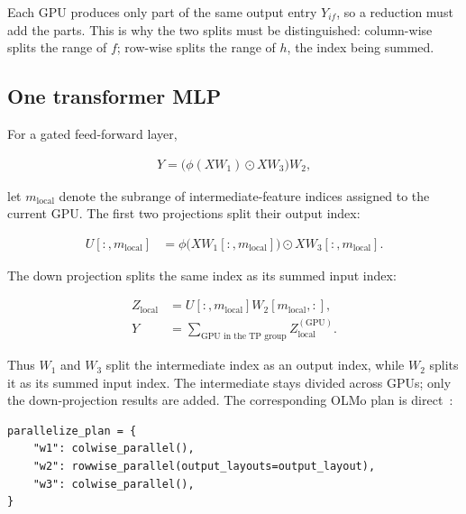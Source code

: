\documentclass[11pt]{article}
\begin{document}
Each GPU produces only part of the same output entry \(Y_{if}\), so a
reduction must add the parts.  This is why the two splits must be
distinguished: column-wise splits the range of \(f\); row-wise splits the
range of \(h\), the index being summed.

\subsection{One transformer MLP}

For a gated feed-forward layer,

\begin{equation}
\begin{split}
Y=\bigl(\phi(XW_1)\odot XW_3\bigr)W_2,
\end{split}
\end{equation}

let \(m_{\mathrm{local}}\) denote the subrange of intermediate-feature indices
assigned to the current GPU.  The first two projections split their output
index:

\begin{equation}
\begin{split}
U[:,m_{\mathrm{local}}]
&=\phi\bigl(XW_1[:,m_{\mathrm{local}}]\bigr)
 \odot XW_3[:,m_{\mathrm{local}}].
\end{split}
\end{equation}

The down projection splits the same index as its summed input index:

\begin{equation}
\begin{split}
Z_{\mathrm{local}}
&=U[:,m_{\mathrm{local}}]W_2[m_{\mathrm{local}},:],\\
Y&=\sum_{\text{GPU in the TP group}}Z_{\mathrm{local}}^{(\text{GPU})}.
\end{split}
\end{equation}

Thus \(W_1\) and \(W_3\) split the intermediate index as an output index,
while \(W_2\) splits it as its summed input index.  The intermediate stays divided
across GPUs; only the down-projection results are added.  The corresponding
OLMo plan is direct~\cite{olmo-feed-forward}:

\begin{lstlisting}[basicstyle=\ttfamily\footnotesize]
parallelize_plan = {
    "w1": colwise_parallel(),
    "w2": rowwise_parallel(output_layouts=output_layout),
    "w3": colwise_parallel(),
}
\end{lstlisting}
\end{document}

